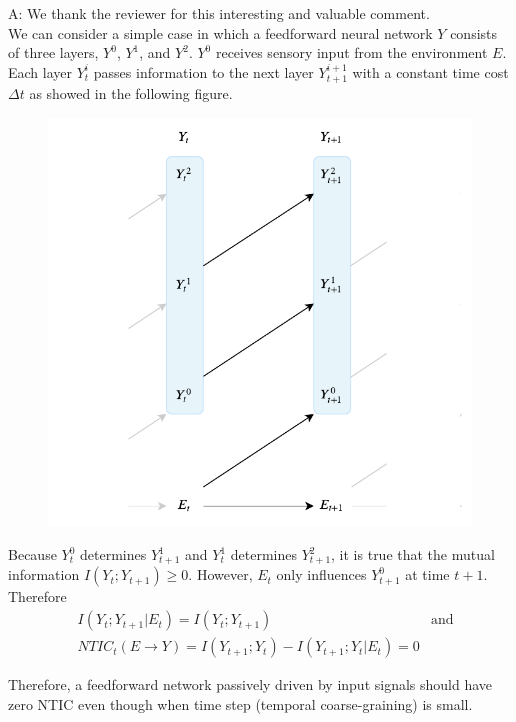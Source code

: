 \documentclass[utf8]{article}
\newenvironment{ans}  
    {\color{Black}\noindent A:}
    {~\newline}
\begin{document}
 		\begin{ans}
			We thank the reviewer for this interesting and valuable comment. \\
			We can consider a simple case in which a feedforward neural network $Y$ consists of three layers, $Y^0$, $Y^1$, and $Y^2$. 
			$Y^0$ receives sensory input from the environment $E$. Each layer $Y^i_t$ passes information to the next layer $Y^{i+1}_{t+1}$ with a constant time cost $\Delta t$ as showed in the following figure.

 			\begin{figure}[H]
 				\centering
 				\includegraphics[width=\textwidth]{WritingMaterials/Fig_rev1_feedforward/Fig_rev1_feedforward} 				
 				\label{fig:rev1_feedforward}
 			\end{figure}
 			
			Because $Y^0_t$ determines $Y^1_{t+1}$ and $Y^1_t$ determines $Y^2_{t+1}$, it is true that the mutual information $I(Y_t; Y_{t+1}) \geq 0$. However, $E_t$ only influences $Y^0_{t+1}$ at time $t+1$. Therefore
			\begin{equation*}
				\begin{aligned}
					& I(Y_t; Y_{t+1}|E_t) = I(Y_t; Y_{t+1}) & \text{and} \\
					& NTIC_t(E\rightarrow Y)=I(Y_{t+1};Y_{t})-I(Y_{t+1};Y_{t}|E_{t}) =0  { }
				\end{aligned}
			\end{equation*}	
			
			Therefore, a feedforward network passively driven by input signals should have zero NTIC even though when time step (temporal coarse-graining) is small. 
			 		
 		\end{ans}
 	
\end{document}
